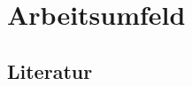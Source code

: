 \section{Arbeitsumfeld}
\label{sec:arbeitsumfeld}

  \subsection{Literatur}
  \label{ssec:literatur}
    \nocite{*}
    \printbibliography


